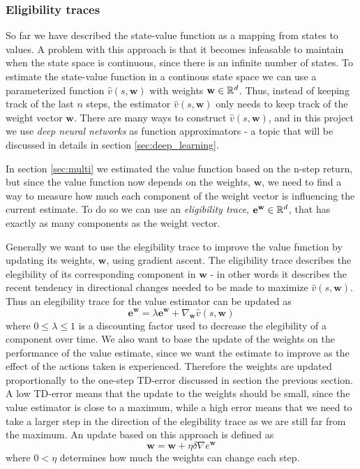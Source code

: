 \documentclass[11pt]{article}
\begin{document}
\subsubsection{Eligibility traces}\label{sec:et}

So far we have described the state-value function as a mapping from states to values.
A problem with this approach is that it becomes infeasable to maintain 
when the state space is continuous, since there is an infinite number of states.
To estimate the state-value function in a continous state space we can use a
parameterized function $\hat{v}(s, \mathbf{w})$ with weights $\mathbf{w} \in \mathbb{R}^d$.
Thus, instead of keeping track of the last $n$ steps, the estimator $\hat{v}(s, \mathbf{w})$
only needs to keep track of the weight vector $\mathbf{w}$.
There are many ways to construct $\hat{v}(s, \mathbf{w})$, and in this project we use \textit{deep neural networks}
as function approximators - a topic that will be discussed in details in section \ref{sec:deep_learning}.

In section \ref{sec:multi} we estimated the value function based on the n-step return, but
since the value function now depends on the weights, $\mathbf{w}$, we need to find a way
to measure how much each component of the weight vector is influencing the
current estimate.
To do so we can use an \textit{eligibility trace}, $\mathbf{e}^{\mathbf{w}} \in \mathbb{R}^d$, that
has exactly as many components as the weight vector.

Generally we want to use the elegibility trace to improve the value function by
updating its weights, $\mathbf{w}$, using gradient ascent.
The eligibility trace describes the elegibility of its corresponding component in $\mathbf{w}$
- in other words it describes the recent tendency in directional changes needed to be made
to maximize $\hat{v}(s, \mathbf{w})$.
Thus an elegibility trace for the value estimator can be updated as
\begin{equation}
    \mathbf{e}^\mathbf{w} = \lambda \mathbf{e}^\mathbf{w} + \nabla_\mathbf{w} \hat{v}(s, \mathbf{w})
\end{equation}
where $0 \leq \lambda \leq 1$ is a discounting factor used to decrease the elegibility of a component
over time.
We also want to base the update of the weights on the performance of the value estimate,
since we want the estimate to improve as the effect of the actions taken is experienced.
Therefore the weights are updated proportionally to the one-step TD-error discussed in section the previous
section.
A low TD-error means that the update to the weights should be small, since the value estimator is
close to a maximum, while a high error means that we need to take a larger step
in the direction of the elegibility trace as we are still far from the maximum.
An update based on this approach is defined as
\begin{equation}
    \mathbf{w} = \mathbf{w} + \eta \delta \nabla e^\mathbf{w}
\end{equation}
where $0 < \eta$ determines how much the weights can change each step.
\end{document}
